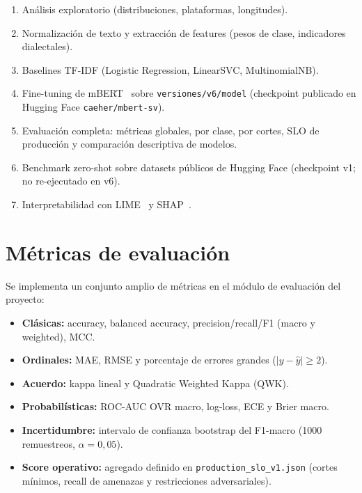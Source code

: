 \begin{enumerate}[leftmargin=*]
  \item Análisis exploratorio (distribuciones, plataformas, longitudes).
  \item Normalización de texto y extracción de features (pesos de clase,
        indicadores dialectales).
  \item Baselines TF-IDF (Logistic Regression, LinearSVC, MultinomialNB).
  \item Fine-tuning de mBERT~\cite{devlin2019bert} sobre
        \texttt{versiones/v6/model} (checkpoint publicado en Hugging Face
        \texttt{caeher/mbert-sv}).
  \item Evaluación completa: métricas globales, por clase, por cortes, SLO de
        producción y comparación descriptiva de modelos.
  \item Benchmark zero-shot sobre datasets públicos de Hugging Face (checkpoint
        v1; no re-ejecutado en v6).
  \item Interpretabilidad con LIME~\cite{ribeiro2016lime} y
        SHAP~\cite{lundberg2017shap}.
\end{enumerate}

\section{Métricas de evaluación}

Se implementa un conjunto amplio de métricas en el módulo de evaluación del
proyecto:

\begin{itemize}[leftmargin=*]
  \item \textbf{Clásicas:} accuracy, balanced accuracy, precision/recall/F1
        (macro y weighted), MCC.
  \item \textbf{Ordinales:} MAE, RMSE y porcentaje de errores grandes
        ($\lvert y - \hat{y}\rvert \ge 2$).
  \item \textbf{Acuerdo:} kappa lineal y Quadratic Weighted Kappa (QWK).
  \item \textbf{Probabilísticas:} ROC-AUC OVR macro, log-loss, ECE y Brier macro.
  \item \textbf{Incertidumbre:} intervalo de confianza bootstrap del F1-macro
        (1000 remuestreos, $\alpha = 0{,}05$).
  \item \textbf{Score operativo:} agregado definido en
        \texttt{production\_slo\_v1.json} (cortes mínimos, recall de amenazas y
        restricciones adversariales).
\end{itemize}

